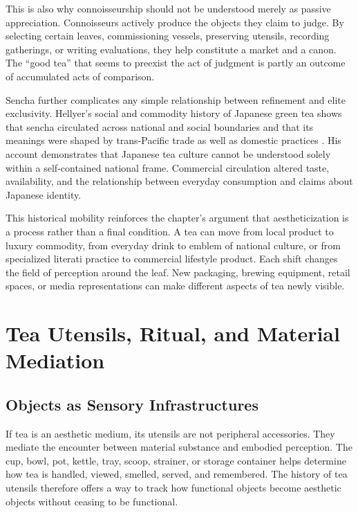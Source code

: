 \documentclass[numbers]{IntechOpen-Book}
\begin{document}
This is also why connoisseurship should not be understood merely as passive appreciation. Connoisseurs actively produce the objects they claim to judge. By selecting certain leaves, commissioning vessels, preserving utensils, recording gatherings, or writing evaluations, they help constitute a market and a canon. The ``good tea'' that seems to preexist the act of judgment is partly an outcome of accumulated acts of comparison.

Sencha further complicates any simple relationship between refinement and elite exclusivity. Hellyer's social and commodity history of Japanese green tea shows that sencha circulated across national and social boundaries and that its meanings were shaped by trans-Pacific trade as well as domestic practices \cite{hellyer}. His account demonstrates that Japanese tea culture cannot be understood solely within a self-contained national frame. Commercial circulation altered taste, availability, and the relationship between everyday consumption and claims about Japanese identity.

This historical mobility reinforces the chapter's argument that aestheticization is a process rather than a final condition. A tea can move from local product to luxury commodity, from everyday drink to emblem of national culture, or from specialized literati practice to commercial lifestyle product. Each shift changes the field of perception around the leaf. New packaging, brewing equipment, retail spaces, or media representations can make different aspects of tea newly visible.

\section{Tea Utensils, Ritual, and Material Mediation}

\subsection{Objects as Sensory Infrastructures}

If tea is an aesthetic medium, its utensils are not peripheral accessories. They mediate the encounter between material substance and embodied perception. The cup, bowl, pot, kettle, tray, scoop, strainer, or storage container helps determine how tea is handled, viewed, smelled, served, and remembered. The history of tea utensils therefore offers a way to track how functional objects become aesthetic objects without ceasing to be functional.
\end{document}
